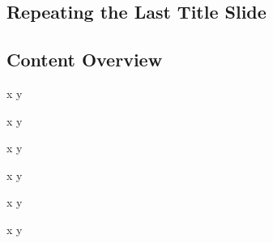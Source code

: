 \documentclass[
	aspectratio=169, %
	8pt, %
]{beamer}
\begin{document}
\subsection{Repeating the Last Title Slide}
\againtitle

\subsection{Content Overview}
\contentoverview[3] %

\begin{frame}{}
    \begin{fancycolumns}[t,columns=6,animation=keep]
        \begin{exampletight}{}
            \begin{fancycolumns}[animation=none]
                x
            \nextcolumn
                y
            \end{fancycolumns}
        \end{exampletight}
    \nextcolumn
        \begin{exampletight}{}
            \begin{fancycolumns}[animation=none]
                x
            \nextcolumn
                y
            \end{fancycolumns}
        \end{exampletight}
    \nextcolumn
        \begin{exampletight}{}
            \begin{fancycolumns}[animation=none]
                x
            \nextcolumn
                y
            \end{fancycolumns}
        \end{exampletight}
    \nextcolumn
        \begin{exampletight}{}
            \begin{fancycolumns}[animation=none]
                x
            \nextcolumn
                y
            \end{fancycolumns}
        \end{exampletight}
    \nextcolumn
        \begin{exampletight}{}
            \begin{fancycolumns}[animation=none]
                x
            \nextcolumn
                y
            \end{fancycolumns}
        \end{exampletight}
    \nextcolumn
        \begin{exampletight}{}
            \begin{fancycolumns}[animation=none]
                x
            \nextcolumn
                y
            \end{fancycolumns}
        \end{exampletight}
    \end{fancycolumns}
\end{frame}
\end{document}
